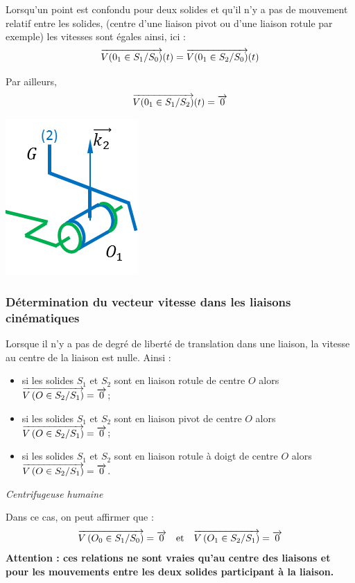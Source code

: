 \documentclass[10pt,oneside]{article}
\begin{document}
\begin{rem}
\begin{minipage}[c]{.65\linewidth}
Lorsqu'un point est confondu pour deux solides et qu'il n'y a pas de mouvement relatif entre les solides, (centre d'une liaison pivot ou d'une liaison rotule par exemple) les vitesses sont égales ainsi, ici : 
$$
\overrightarrow{V(0_1\in S_1/S_0)}(t) = \overrightarrow{V(0_1\in S_2/S_0)}(t)
$$

Par ailleurs, 
$$
\overrightarrow{V(0_1\in S_1/S_2)}(t) = \overrightarrow{0}
$$
\end{minipage}\hfill
\begin{minipage}[c]{.3\linewidth}
\begin{center}
\includegraphics[width=.6\textwidth]{png/centrifugeuse_4}
\end{center}
\end{minipage}
\end{rem}
\subsubsection{Détermination du vecteur vitesse dans les liaisons cinématiques}

\begin{resultat}
Lorsque il n'y a pas de degré de liberté de translation dans une liaison, la vitesse au centre de la liaison est nulle. Ainsi : 
\begin{itemize}
\item si les solides $S_1$ et $S_2$ sont en liaison rotule de centre $O$ alors $\overrightarrow{V\left( {O} \in {S_2}/{S_1}\right)}=\overrightarrow{0}$;
\item si les solides $S_1$ et $S_2$ sont en liaison pivot de centre $O$ alors $\overrightarrow{V\left( {O} \in {S_2}/{S_1}\right)}=\overrightarrow{0}$;
\item si les solides $S_1$ et $S_2$ sont en liaison rotule à doigt de centre $O$ alors $\overrightarrow{V\left( {O} \in {S_2}/{S_1}\right)}=\overrightarrow{0}$.
\end{itemize}
\end{resultat}
\begin{exemple}
\textit{Centrifugeuse humaine}

Dans ce cas, on peut affirmer que :
$$
 \overrightarrow{V\left( {O_0} \in {S_1}/{S_0}\right)} = \overrightarrow{0} \quad \text{et} \quad 
\overrightarrow{V\left( {O_1} \in {S_2}/{S_1}\right)} = \overrightarrow{0}
$$
\textbf{Attention : ces relations ne sont vraies qu'au centre des liaisons et pour les mouvements entre les deux solides participant à la liaison.} 
\end{exemple}
\end{document}

